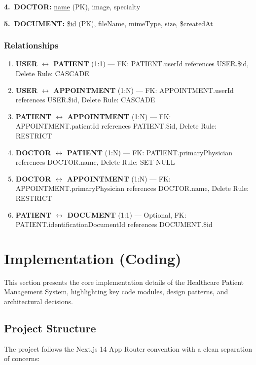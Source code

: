 \documentclass[11pt,a4paper]{article}
\begin{document}
\textbf{4.\ DOCTOR:} \underline{name} (PK), image, specialty

\textbf{5.\ DOCUMENT:} \underline{\$id} (PK), fileName, mimeType, size, \$createdAt

\subsubsection{Relationships}

\begin{enumerate}
    \item \textbf{USER $\leftrightarrow$ PATIENT} (1:1) --- FK: PATIENT.userId references USER.\$id, Delete Rule: CASCADE
    \item \textbf{USER $\leftrightarrow$ APPOINTMENT} (1:N) --- FK: APPOINTMENT.userId references USER.\$id, Delete Rule: CASCADE
    \item \textbf{PATIENT $\leftrightarrow$ APPOINTMENT} (1:N) --- FK: APPOINTMENT.patientId references PATIENT.\$id, Delete Rule: RESTRICT
    \item \textbf{DOCTOR $\leftrightarrow$ PATIENT} (1:N) --- FK: PATIENT.primaryPhysician references DOCTOR.name, Delete Rule: SET NULL
    \item \textbf{DOCTOR $\leftrightarrow$ APPOINTMENT} (1:N) --- FK: APPOINTMENT.primaryPhysician references DOCTOR.name, Delete Rule: RESTRICT
    \item \textbf{PATIENT $\leftrightarrow$ DOCUMENT} (1:1) --- Optional, FK: PATIENT.identificationDocumentId references DOCUMENT.\$id
\end{enumerate}

\newpage
\section{Implementation (Coding)}

This section presents the core implementation details of the Healthcare Patient Management System, highlighting key code modules, design patterns, and architectural decisions.

\subsection{Project Structure}

The project follows the Next.js 14 App Router convention with a clean separation of concerns:
\end{document}
